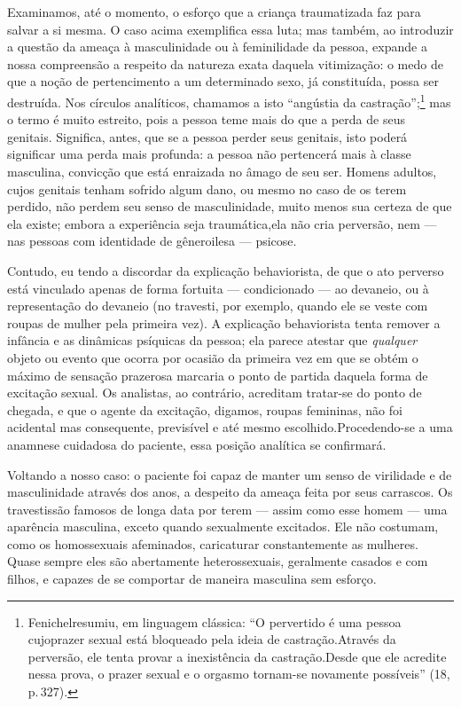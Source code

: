 Examinamos, até o momento, o esforço que a criança traumatizada faz
para salvar a si mesma. O caso acima exemplifica essa luta; mas também,
ao introduzir a questão da ameaça à masculinidade ou à feminilidade da
pessoa, expande a nossa compreensão a respeito da natureza exata
daquela vitimização: o medo de que a noção de pertencimento a um
determinado sexo, já constituída,\idxcastatrav{} possa ser destruída. Nos círculos
analíticos, chamamos a isto\idxtravemangu{} ``angústia\idxcastaiden{} da
castração'';\footnote{ Fenichel\idxfenic[|nn] resumiu, em linguagem
clássica: ``O pervertido é uma pessoa cujo\idxtravemangu[|nn] prazer sexual
está bloqueado pela ideia de castração.\idxcastaiden[|nn] Através da perversão, ele tenta
provar a inexistência da castração.\idxcastatrav[|nn] Desde que ele acredite nessa prova,
o prazer sexual e o orgasmo tornam-se novamente
possíveis'' (18, p.\,327).} mas o termo é muito estreito,
pois a pessoa teme mais do que a perda de seus genitais. Significa,
antes, que se a pessoa perder seus genitais, isto poderá significar
uma perda mais profunda: a pessoa não pertencerá mais à classe
masculina, convicção que está enraizada no âmago de seu ser. Homens
adultos, cujos genitais tenham sofrido algum dano, ou mesmo no caso de
os terem perdido, não perdem seu senso de masculinidade, muito menos
sua certeza de que ela existe; embora a experiência seja traumática,\idxtravetrau[|)]
ela não cria perversão, nem --- nas pessoas com identidade de gênero\idxtraumatrav[|)]
ilesa --- psicose.

Contudo, eu tendo a discordar da explicação behaviorista, de que o
ato perverso está vinculado apenas de forma fortuita --- condicionado
--- ao devaneio, ou à representação do devaneio (no travesti, por
exemplo, quando ele se veste com roupas de mulher pela primeira vez). A
explicação behaviorista tenta remover a infância e as dinâmicas
psíquicas da pessoa; ela parece atestar que \textit{qualquer} objeto ou
evento que ocorra por ocasião da primeira vez em que se obtém o máximo
de sensação prazerosa marcaria o ponto de partida daquela forma de
excitação sexual.\idxfantaporn{} Os analistas, ao contrário, acreditam tratar-se do
ponto de chegada, e que o agente da excitação, digamos, roupas
femininas, não foi acidental mas consequente, previsível e até mesmo
escolhido.\idxcond[|)] Procedendo-se a uma anamnese cuidadosa do paciente, essa
posição analítica se confirmará.

Voltando a nosso caso: o paciente foi capaz de manter um senso de
virilidade e de masculinidade através dos anos, a despeito da ameaça
feita por seus carrascos. Os travestis\idxtravemporn[|(] são famosos de longa data por
terem --- assim como esse homem --- uma aparência masculina, exceto
quando sexualmente excitados. Ele não costumam, como os homossexuais
afeminados,\idxhomosafem{} caricaturar constantemente as mulheres. Quase sempre eles
são abertamente heterossexuais,\idxtravemhete{} geralmente casados e com filhos, e
capazes de se comportar de maneira masculina sem esforço.

